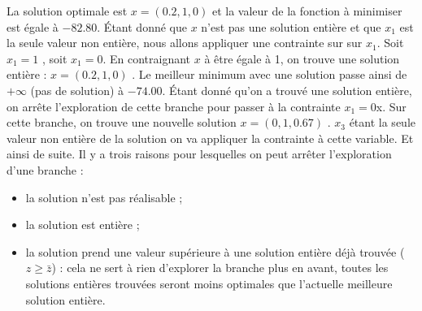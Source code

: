La solution optimale  est $x = (0.2, 1, 0)$ et la valeur de la fonction à minimiser est égale à $-82.80$. Étant donné que $x$ n’est pas une solution entière et que $x_1$ est la seule valeur non entière, nous allons appliquer une contrainte sur sur $x_1$. Soit $x_1 = 1$ , soit $x_1 = 0$. En contraignant $x$ à être égale à 1, on trouve une solution entière : $x = (0.2, 1, 0)$ . Le meilleur minimum avec une solution passe ainsi de $+\infty$ (pas de solution) à $-74.00$. Étant donné qu’on a trouvé une solution entière, on arrête l’exploration de cette branche pour passer à la contrainte $x_1 = 0$x. Sur cette branche, on trouve une nouvelle solution $x = (0, 1, 0.67)$ . $x_3$ étant la seule valeur non entière de la solution on va appliquer la contrainte à cette variable. Et ainsi de suite. Il y a trois raisons pour lesquelles on peut arrêter l’exploration d’une branche :
\begin{itemize}
	\item la solution n’est pas réalisable ;
	\item la solution est entière   ;
	\item la solution prend une valeur supérieure à une solution entière déjà trouvée ($z \geq \bar{z}$) : cela ne sert à rien d’explorer la branche plus en avant, toutes les solutions entières trouvées seront moins optimales que l’actuelle meilleure solution entière.
\end{itemize}